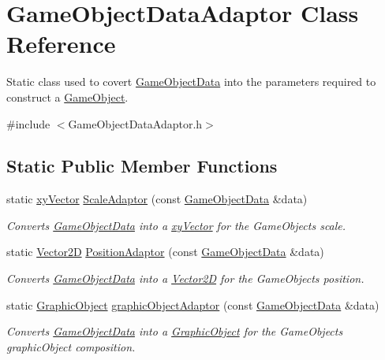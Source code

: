 \hypertarget{class_game_object_data_adaptor}{}\section{Game\+Object\+Data\+Adaptor Class Reference}
\label{class_game_object_data_adaptor}


Static class used to covert \hyperlink{struct_game_object_data}{Game\+Object\+Data} into the parameters required to construct a \hyperlink{class_game_object}{Game\+Object}.  




{\ttfamily \#include $<$Game\+Object\+Data\+Adaptor.\+h$>$}

\subsection*{Static Public Member Functions}
\begin{DoxyCompactItemize}
\item 
static \hyperlink{structxy_vector}{xy\+Vector} \hyperlink{class_game_object_data_adaptor_aaaee19dcb6f182d26eb22f516760d67d}{Scale\+Adaptor} (const \hyperlink{struct_game_object_data}{Game\+Object\+Data} \&data)
\begin{DoxyCompactList}\small\item\em Converts \hyperlink{struct_game_object_data}{Game\+Object\+Data} into a \hyperlink{structxy_vector}{xy\+Vector} for the Game\+Objects scale. \end{DoxyCompactList}\item 
static \hyperlink{class_vector2_d}{Vector2D} \hyperlink{class_game_object_data_adaptor_a5ed602ccf6cb6b189dde62c037af59ad}{Position\+Adaptor} (const \hyperlink{struct_game_object_data}{Game\+Object\+Data} \&data)
\begin{DoxyCompactList}\small\item\em Converts \hyperlink{struct_game_object_data}{Game\+Object\+Data} into a \hyperlink{class_vector2_d}{Vector2D} for the Game\+Objects position. \end{DoxyCompactList}\item 
static \hyperlink{class_graphic_object}{Graphic\+Object} \hyperlink{class_game_object_data_adaptor_aecb0cb3d75f42cf440a1fe23ccf81324}{graphic\+Object\+Adaptor} (const \hyperlink{struct_game_object_data}{Game\+Object\+Data} \&data)
\begin{DoxyCompactList}\small\item\em Converts \hyperlink{struct_game_object_data}{Game\+Object\+Data} into a \hyperlink{class_graphic_object}{Graphic\+Object} for the Game\+Objects graphic\+Object composition. \end{DoxyCompactList}\end{DoxyCompactItemize}


